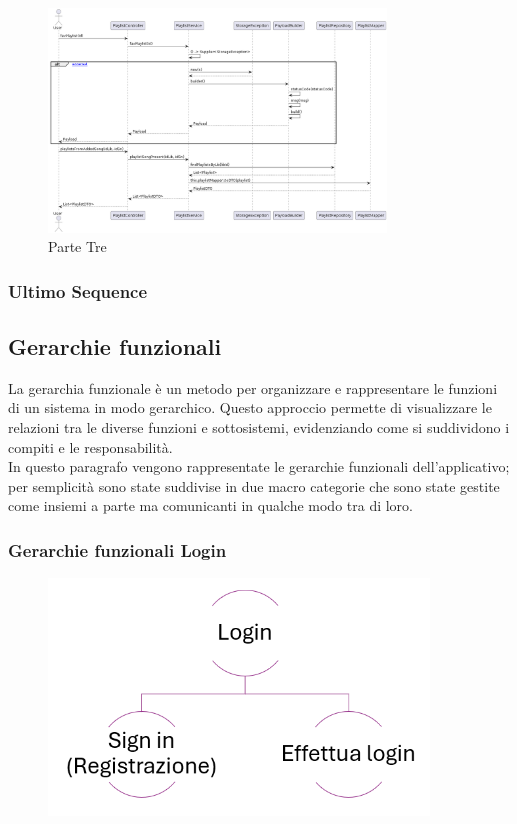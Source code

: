 \documentclass{article}
\begin{document}
		\begin{figure}[H]
			\centering
			\includegraphics[width=0.8\textwidth]{Immagini/sequence3}
			\caption{Parte Tre}
		\end{figure}
		\subsubsection{Ultimo Sequence}
		\newpage
		\subsection{Gerarchie funzionali}
		La gerarchia funzionale è un metodo per organizzare e rappresentare le funzioni di un sistema in modo gerarchico. Questo approccio permette di visualizzare le relazioni tra le diverse funzioni e sottosistemi, evidenziando come si suddividono i compiti e le responsabilità.\\
		In questo paragrafo vengono rappresentate le gerarchie funzionali dell’applicativo; per semplicità sono state suddivise in due macro categorie che sono state gestite come insiemi a parte ma comunicanti in qualche modo tra di loro.
		\subsubsection{Gerarchie funzionali Login}
		\begin{figure}[H]
			\centering
			\includegraphics[width=0.9\textwidth]{Immagini/gerarchialogin}
		\end{figure}
\end{document}
